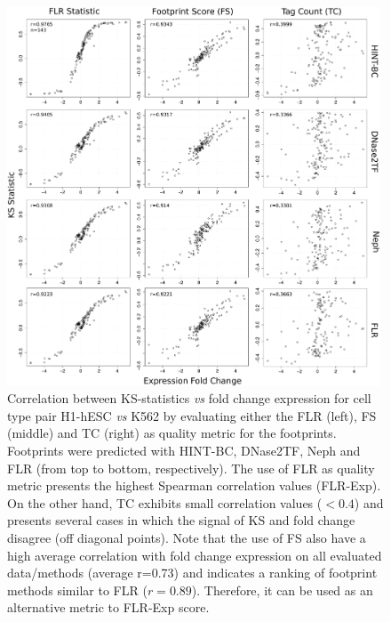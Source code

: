 \documentclass[11pt]{article}
\begin{document}
\begin{figure}[h!]
\centering
\includegraphics[width=0.99\textwidth]{Figs/Fig2.pdf}
\caption{Correlation between KS-statistics \textit{vs} fold change expression for cell type pair H1-hESC \textit{vs} K562 by evaluating either the FLR (left), FS (middle) and TC (right) as quality metric for the footprints. Footprints were predicted with HINT-BC, DNase2TF, Neph and FLR (from top to bottom, respectively). The use of FLR as quality metric presents the highest Spearman correlation values (FLR-Exp). On the other hand, TC exhibits small correlation values ($< 0.4$) and presents several cases in which the signal of KS and fold change disagree (off diagonal points). Note that the use of FS also have a high average correlation with fold change expression on all evaluated data/methods (average r=0.73) and indicates a ranking of footprint methods similar to FLR ($r=0.89$). Therefore, it can be used as an alternative metric to FLR-Exp score.}
\label{fig:flrexpmetric}
\end{figure}

\clearpage
\end{document}
